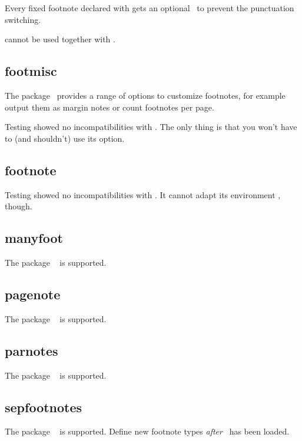 \documentclass{fnpct-manual}
\begin{document}
Every fixed footnote declared with  gets an optional
\sarg\ to prevent the punctuation switching.

\begin{bewareofthedog}
   cannot be used together with .
\end{bewareofthedog}

\subsection{footmisc}\label{sec:footmisc}
The  package~\cite{pkg:footmisc} provides a range of options to
customize footnotes, for example output them as margin notes or count
footnotes per page.

Testing showed no incompatibilities with .  The only thing is
that you won't have to (and shouldn't) use its  option.

\subsection{footnote}\label{sec:footnote}

Testing showed no incompatibilities with .  It cannot adapt its
environment , though.

\subsection{manyfoot}\label{sec:manyfoot}
The package ~\cite{pkg:manyfoot} is supported.

\subsection{pagenote}\label{sec:pagenote}
The package ~\cite{pkg:pagenote} is supported.

\subsection{parnotes}\label{sec:parnotes}
The package ~\cite{pkg:parnotes} is supported.

\subsection{sepfootnotes}\label{sec:sepfootnotes}
The package ~\cite{pkg:sepfootnotes} is supported.  Define
new footnote types \emph{after} \fnpct\ has been loaded.
\end{document}
